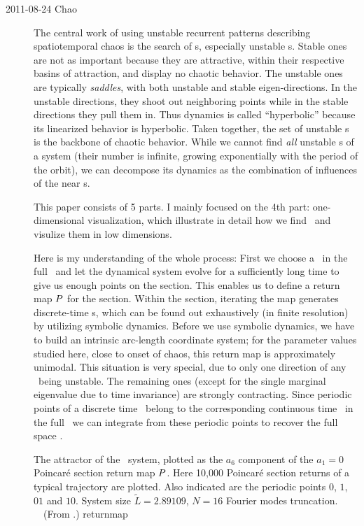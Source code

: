 \begin{description}

\item[2011-08-24 Chao]
The central work of using unstable recurrent patterns describing
spatiotemporal chaos is the search of \po s, especially unstable \po s.
Stable ones are not as important because they are attractive, within
their respective basins of attraction, and display no chaotic behavior.
The unstable ones are typically \emph{saddles}, with both unstable and
stable eigen-directions. In the unstable directions, they shoot out
neighboring points while in the stable directions they pull them in. Thus
dynamics is called ``hyperbolic'' because its linearized behavior is
hyperbolic. Taken together, the set of unstable \po s is the backbone of
chaotic behavior. While we cannot find \emph{all} unstable \po s of a
system (their number is infinite, growing exponentially with the period
of the orbit), we can decompose its dynamics as the combination of
influences of the near \po s.

This paper consists of 5 parts. I mainly focused on the 4th part:
one-dimensional visualization, which illustrate in detail how we find
\po\  and visulize them in low dimensions.

Here is my understanding of the whole process: First we choose a
\PoincSec\ in the full \statesp\ and let the dynamical system evolve for
a sufficiently long time to give us enough points on the section. This
enables us to define a return map $P$ for the section. Within the section,
iterating the map generates discrete-time \po s, which can be
found out exhaustively (in finite resolution) by utilizing symbolic
dynamics. Before we use symbolic dynamics, we have to build an intrinsic
arc-length coordinate system; for the parameter values studied here, close
to onset of chaos, this return map is approximately unimodal. This
situation is very special, due to only one direction of any \po\ being
unstable. The remaining ones (except for the single marginal eigenvalue
due to time invariance) are strongly contracting.
Since periodic points of a discrete time \po\ belong to the corresponding
continuous time \po\  in the full \statesp\, we can integrate from these
periodic points to recover the full space \po.

{}{
The attractor of the \KS\ system,
plotted as the $a_6$
component of the $a_1=0$ Poincar\'e section return map $P$. Here 10,000
Poincar\'e section returns of a typical trajectory are plotted. Also
indicated are the periodic points
${0}$, ${1}$, ${01}$ and ${10}$.
System size $ \tilde{L} = 2.89109$, $N=16$ Fourier modes truncation.
~~(From .)
}{returnmap}


\end{description}
